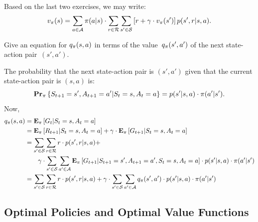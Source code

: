 Based on the last two exercises, we may write:
\begin{equation}
    v_{\pi} (s) = \sum_{a \in \mathcal{A}} \pi (a \vert s) \cdot 
            \sum_{r \in \mathcal{R}} \sum_{s' \in \mathcal{S}} \left [ r + \gamma \cdot v_{\pi}(s') \right ] p(s', r \vert s, a).
\end{equation}

\begin{exer}
Give an equation for $q_{\pi} (s, a)$ in terms of the 
value~$q_{\pi} (s', a')$ of the next state-action pair~$(s', a')$. 
\end{exer}
\begin{solution}
The probability that the next state-action pair is $(s', a')$ given 
that the current state-action pair is $(s, a)$ is:
\[
    \mathbf{Pr}_{\pi} \left \{ S_{t + 1} = s', A_{t + 1} = a' \vert S_t = s, A_t = a \right \}
    = p(s' \vert s, a) \cdot \pi (a' \vert s').
\]
Now,
\begin{align*}
    q_{\pi} (s, a) & = \mathbf{E}_{\pi} \left [ G_t \vert S_t = s, A_t = a \right ] \\
                       & = \mathbf{E}_{\pi} \left [ R_{t + 1} \vert S_t = s, A_t = a \right ] + 
                           \gamma \cdot \mathbf{E}_{\pi} \left [ G_{t + 1} \vert S_t = s, A_t = a \right ] \\
                       & = \sum_{s' \in \mathcal{S}} \sum_{r \in \mathcal{R}} r \cdot p(s', r \vert s, a) + \\
                       & \quad \quad \gamma \cdot \sum_{s' \in \mathcal{S}} \sum_{a' \in \mathcal{A}} 
                            \mathbf{E}_{\pi} \left [ G_{t + 1} \vert S_{t + 1} = s', A_{t + 1} = a', S_t = s, A_t = a \right ] \cdot 
                            p(s' \vert s, a) \cdot \pi (a' \vert s')\\
                       & = \sum_{s' \in \mathcal{S}} \sum_{r \in \mathcal{R}} r \cdot p(s', r \vert s, a) + \gamma \cdot 
                           \sum_{s' \in \mathcal{S}} \sum_{a' \in \mathcal{A}} q_{\pi} (s', a') \cdot p(s' \vert s, a) \cdot \pi (a' \vert s')
\end{align*}
\end{solution}

\subsection{Optimal Policies and Optimal Value Functions}

